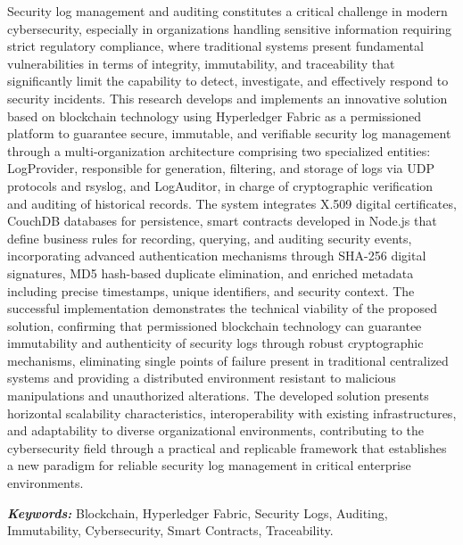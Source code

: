 
\noindent
Security log management and auditing constitutes a critical challenge in modern cybersecurity, especially in organizations handling sensitive information requiring strict regulatory compliance, where traditional systems present fundamental vulnerabilities in terms of integrity, immutability, and traceability that significantly limit the capability to detect, investigate, and effectively respond to security incidents. This research develops and implements an innovative solution based on blockchain technology using Hyperledger Fabric as a permissioned platform to guarantee secure, immutable, and verifiable security log management through a multi-organization architecture comprising two specialized entities: LogProvider, responsible for generation, filtering, and storage of logs via UDP protocols and rsyslog, and LogAuditor, in charge of cryptographic verification and auditing of historical records. The system integrates X.509 digital certificates, CouchDB databases for persistence, smart contracts developed in Node.js that define business rules for recording, querying, and auditing security events, incorporating advanced authentication mechanisms through SHA-256 digital signatures, MD5 hash-based duplicate elimination, and enriched metadata including precise timestamps, unique identifiers, and security context. The successful implementation demonstrates the technical viability of the proposed solution, confirming that permissioned blockchain technology can guarantee immutability and authenticity of security logs through robust cryptographic mechanisms, eliminating single points of failure present in traditional centralized systems and providing a distributed environment resistant to malicious manipulations and unauthorized alterations. The developed solution presents horizontal scalability characteristics, interoperability with existing infrastructures, and adaptability to diverse organizational environments, contributing to the cybersecurity field through a practical and replicable framework that establishes a new paradigm for reliable security log management in critical enterprise environments.

\vspace{10pt}
\noindent\textbf{\emph{Keywords:}} {Blockchain, Hyperledger Fabric, Security Logs, Auditing, Immutability, Cybersecurity, Smart Contracts, Traceability.}